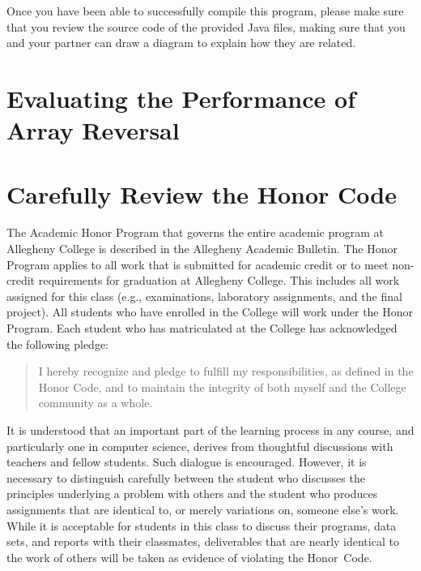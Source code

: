 Once you have been able to successfully compile this program, please make sure that you review the source code of the
provided Java files, making sure that you and your partner can draw a diagram to explain how they are related.

\section*{Evaluating the Performance of Array Reversal}



\section*{Carefully Review the Honor Code}

The Academic Honor Program that governs the entire academic program at Allegheny College is described in the Allegheny
Academic Bulletin.  The Honor Program applies to all work that is submitted for academic credit or to meet non-credit
requirements for graduation at Allegheny College.  This includes all work assigned for this class (e.g., examinations,
  laboratory assignments, and the final project).  All students who have enrolled in the College will work under the Honor
Program.  Each student who has matriculated at the College has acknowledged the following pledge:

\vspace*{-.1in}
\begin{quote}
  I hereby recognize and pledge to fulfill my responsibilities, as defined in the Honor Code, and to maintain the
  integrity of both myself and the College community as a whole.
\end{quote}
\vspace*{-.1in}

\noindent It is understood that an important part of the learning process in any course, and particularly one in
computer science, derives from thoughtful discussions with teachers and fellow students.  Such dialogue is encouraged.
However, it is necessary to distinguish carefully between the student who discusses the principles underlying a problem
with others and the student who produces assignments that are identical to, or merely variations on, someone else's
work.  While it is acceptable for students in this class to discuss their programs, data sets, and reports with their
classmates, deliverables that are nearly identical to the work of others will be taken as evidence of violating the
\mbox{Honor Code}.

